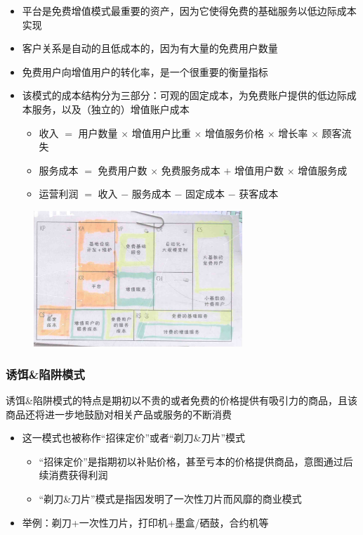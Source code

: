     \begin{itemize}
        \item 平台是免费增值模式最重要的资产，因为它使得免费的基础服务以低边际成本实现
        \item 客户关系是自动的且低成本的，因为有大量的免费用户数量
        \item 免费用户向增值用户的转化率，是一个很重要的衡量指标
        \item 该模式的成本结构分为三部分：可观的固定成本，为免费账户提供的低边际成本服务，以及（独立的）增值账户成本
        \begin{itemize}
            \item 收入 $=$ 用户数量 $\times$ 增值用户比重 $\times$ 增值服务价格 $\times$ 增长率 $\times$ 顾客流失
            \item 服务成本 $=$ 免费用户数 $\times$ 免费服务成本 $+$ 增值用户数 $\times$ 增值服务成
            \item 运营利润 $=$ 收入 $-$ 服务成本 $-$ 固定成本 $-$ 获客成本
        \end{itemize}
    \end{itemize}

    \begin{figure}[H]
		\centering
        \vspace{-0.5em}
		\includegraphics[width=0.7\textwidth]{img/免费增值模式总结.png}
        \vspace{-0.5em}
	\end{figure}

    \subsubsection{诱饵\&陷阱模式}

    诱饵\&陷阱模式的特点是期初以不贵的或者免费的价格提供有吸引力的商品，且该商品还将进一步地鼓励对相关产品或服务的不断消费
    \begin{itemize}
        \item 这一模式也被称作“招徕定价”或者“剃刀\&刀片”模式
        \begin{itemize}
            \item “招徕定价”是指期初以补贴价格，甚至亏本的价格提供商品，意图通过后续消费获得利润
            \item “剃刀\&刀片”模式是指因发明了一次性刀片而风靡的商业模式
        \end{itemize}
        \item 举例：剃刀+一次性刀片，打印机+墨盒/硒鼓，合约机等
    \end{itemize}

